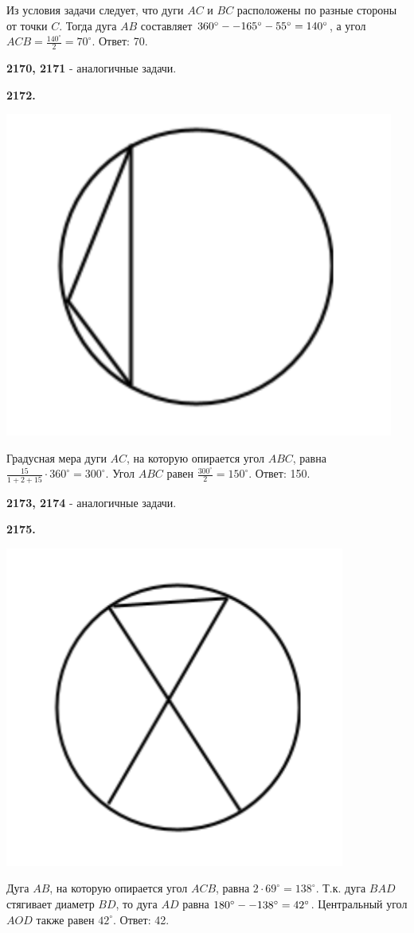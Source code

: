 Из условия задачи следует, что дуги $AC$ и $BC$ расположены по разные стороны от точки $C$. Тогда дуга $AB$ составляет $360^\circ-\linebreak-165^\circ-55^\circ=140^\circ$, а угол $ACB=\frac{140^\circ}{2}=70^\circ$. \newline \null \hspace*{\fill} Ответ: 70.

\textbf{2170, 2171} - аналогичные задачи.

\textbf{2172.}

{\centering \includegraphics[width=0.35\linewidth]{Geometry/Content/46.png}
	
}

Градусная мера дуги $AC$, на которую опирается угол $ABC$, равна
$\frac{15}{1+2+15}\cdot360^\circ=300^\circ$. Угол $ABC$ равен $\frac{300^\circ}{2}=150^\circ$. \newline \null \hspace*{\fill} Ответ: 150.

\textbf{2173, 2174} - аналогичные задачи.

\textbf{2175.}

{\centering \includegraphics[width=0.35\linewidth]{Geometry/Content/47.png}
	
}

Дуга $AB$, на которую опирается угол $ACB$, равна $2\cdot69^\circ=138^\circ$. Т.к. дуга $BAD$ стягивает диаметр $BD$, то дуга $AD$ равна $180^\circ-\linebreak-138^\circ=42^\circ$. Центральный угол $AOD$ также равен $42^\circ$. \newline \null \hspace*{\fill} Ответ: 42.

